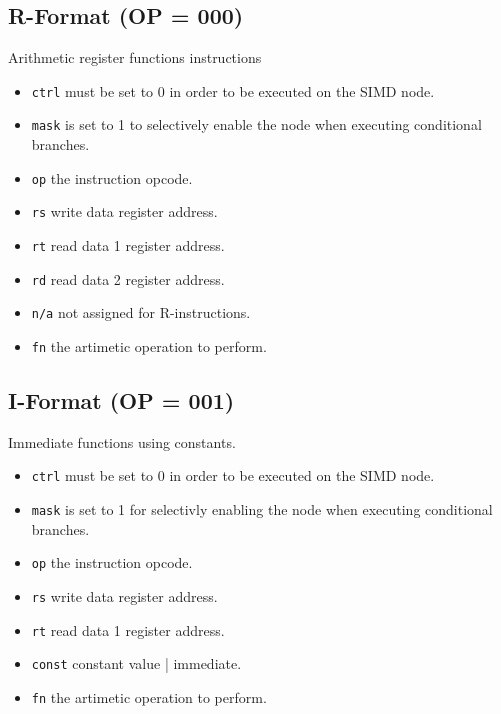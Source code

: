 \subsection[R-Format]{R-Format (OP = 000)}
Arithmetic register functions instructions



\begin{itemize}
\item {\tt ctrl} must be set to 0 in order to be executed on the SIMD node.
\item {\tt mask} is set to 1 to selectively enable the node when executing
  conditional branches.
\item {\tt op} the instruction opcode.
\item {\tt rs} write data register address.
\item {\tt rt} read data 1 register address.
\item {\tt rd} read data 2 register address.
\item {\tt n/a} not assigned for R-instructions.
\item {\tt fn} the artimetic operation to perform.
\end{itemize}



\subsection[I-Format]{I-Format (OP = 001)}
Immediate functions using constants.



\begin{itemize}
\item {\tt ctrl} must be set to 0 in order to be executed on the SIMD node.
\item {\tt mask} is set to 1 for selectivly enabling the node when executing
  conditional branches.
\item {\tt op} the instruction opcode.
\item {\tt rs} write data register address.
\item {\tt rt} read data 1 register address.
\item {\tt const} constant value | immediate.
\item {\tt fn} the artimetic operation to perform.
\end{itemize}



